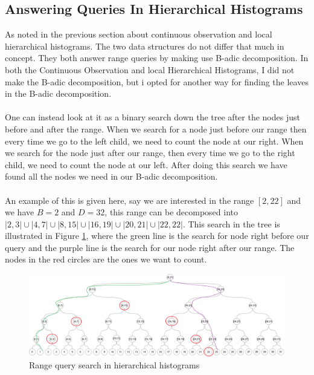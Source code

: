 \documentclass[11pt]{article}
\theoremstyle{definition}
\begin{document}
\subsection{Answering Queries In Hierarchical Histograms}\label{decom}
As noted in the previous section about continuous observation and local hierarchical histograms. The two data structures do not differ that much in concept. They both answer range queries by making use B-adic decomposition. In both the Continuous Observation and local Hierarchical Histograms, I did not make the B-adic decomposition, but i opted for another way for finding the leaves in the B-adic decomposition. \\ \\
One can instead look at it as a binary search down the tree after the nodes just before and after the range. When we search for a node just before our range then every time we go to the left child, we need to count the node at our right. When we search for the node just after our range, then every time we go to the right child, we need to count the node at our left. After doing this search we have found all the nodes we need in our B-adic decomposition.\\ \\
An example of this is given here, say we are interested in the range $[2,22]$ and we have $B=2$ and $D=32$, this range can be decomposed into $|2,3| \cup|4,7| \cup|8,15| \cup|16,19| \cup|20,21| \cup|22,22|$. This search in the tree is illustrated in Figure \ref{fig:disjoint_se_1}, where the green line is the search for node right before our query and the purple line is the search for our node right after our range. The nodes in the red circles are the ones we want to count. 
\begin{figure}[H]
    \centering
    \includegraphics[width=.8\linewidth]{figures/disjoint_search_1.png}
    \caption{Range query search in hierarchical histograms}
    \label{fig:disjoint_se_1}
\end{figure}
\end{document}
